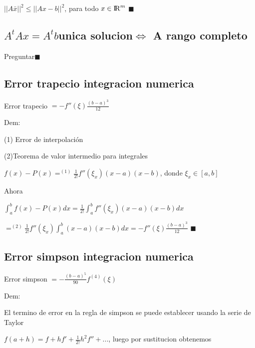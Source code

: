 \documentclass{article}
\begin{document}
$||A\bar{x}||^2 \leq ||Ax-b||^2$, para todo $x \in {\rm I\!R}^m$ $\blacksquare$


\vspace{10mm}

\subsection{$A^tAx=A^tb$unica solucion$\Leftrightarrow$  A rango completo}\label{Relacion-DIf-Divididas-con-derivada-n-esima}

Preguntar$\blacksquare$

\vspace{10mm}

\subsection{Error trapecio integracion numerica}\label{Error-trapecio-integracion-numerica}

Error trapecio $= - f''(\xi)\displaystyle\frac{(b-a)^3}{12}$

Dem:

(1) Error de interpolación

(2)Teorema de valor intermedio para integrales

$f(x)-P(x) =^{(1)} \displaystyle\frac{1}{2!}f''(\xi_x)(x-a)(x-b) $, donde $\xi_x \in [a,b]$

Ahora

$\displaystyle\int_{a}^{b}f(x)-P(x)dx =  \displaystyle\frac{1}{2!}\displaystyle\int_{a}^{b}f''(\xi_x)(x-a)(x-b)dx$

$=^{(2)}\displaystyle\frac{1}{2!}f''(\xi_x)\displaystyle\int_{a}^{b}(x-a)(x-b)dx
=-f''(\xi)\displaystyle\frac{(b-a)^3}{12}$ $\blacksquare$


\vspace{10mm}

\subsection{Error simpson integracion numerica}\label{Error-simpson-integracion-numerica}

Error simpson $= - \displaystyle\frac{(b-a)^5}{90} f^{(4)}(\xi)$

Dem:

El termino de error en la regla de simpson se puede establecer usando la serie de Taylor

$f(a+h) = f + hf' + \displaystyle\frac{1}{2!}h^2f''+... $, luego por sustitucion obtenemos
\end{document}
